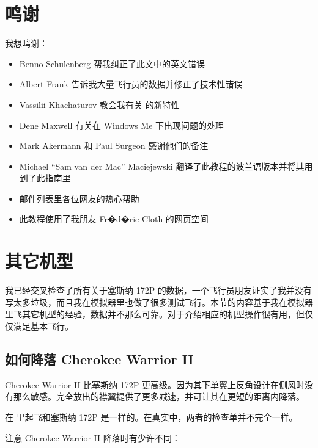 \section{鸣谢}

我想鸣谢：
\begin{itemize}
\item Benno Schulenberg 帮我纠正了此文中的英文错误
\item Albert Frank 告诉我大量飞行员的数据并修正了技术性错误
\item Vassilii Khachaturov 教会我有关 \FlightGear{} 的新特性
\item Dene Maxwell 有关在 Windows Me 下出现问题的处理
\item Mark Akermann 和 Paul Surgeon 感谢他们的备注
\item Michael ``Sam van der Mac'' Maciejewski 翻译了此教程的波兰语版本并将其用到了此指南里
\item \FlightGear{} 邮件列表里各位网友的热心帮助
\item {} 此教程使用了我朋友 Fr�d�ric Cloth 的网页空间
\end{itemize}

\section{其它机型}

我已经交叉检查了所有关于塞斯纳 172P 的数据，一个飞行员朋友证实了我并没有写太多垃圾，而且我在模拟器里也做了很多测试飞行。本节的内容基于我在模拟器里飞其它机型的经验，数据并不那么可靠。对于介绍相应的机型操作很有用，但仅仅满足基本飞行。

\subsection{如何降落 Cherokee Warrior II}
\label{sec:Cherokee}

Cherokee Warrior II 比塞斯纳 172P 更高级。因为其下单翼上反角设计在侧风时没有那么敏感。完全放出的襟翼提供了更多减速，并可让其在更短的距离内降落。

在 \FlightGear{} 里起飞和塞斯纳 172P 是一样的。在真实中，两者的检查单并不完全一样。

注意 Cherokee Warrior II 降落时有少许不同：

